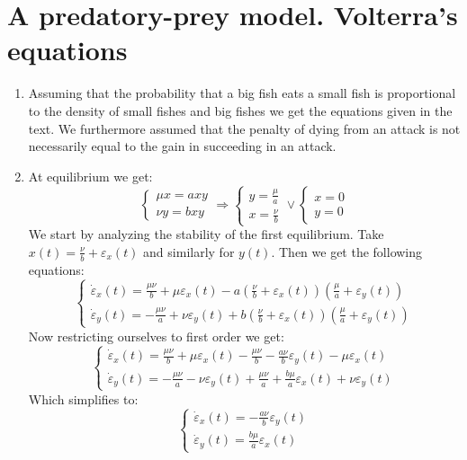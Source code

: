 \documentclass[10pt,a4paper]{book}
\begin{document}
\section{A predatory-prey model. Volterra's equations}

\begin{enumerate}
\item Assuming that the probability that a big fish eats a small fish is proportional to the density of small fishes and big fishes we get the equations given in the text. We furthermore assumed that the penalty of dying from an attack is not necessarily equal to the gain in succeeding in an attack. 

\item At equilibrium we get:
\[
\begin{cases}
\mu x = a xy\\
\nu y = b xy
\end{cases} \Rightarrow \begin{cases}
y = \frac{\mu}{a}\\
x = \frac{\nu}{b}
\end{cases} \lor \begin{cases}
x = 0\\
y = 0
\end{cases}
\]
We start by analyzing the stability of the first equilibrium. Take $x(t) = \frac{\nu}{b} + \varepsilon_x(t)$ and similarly for $y(t)$. Then we get the following equations:
\[
\begin{cases}
\dot{\varepsilon}_x(t) = \frac{\mu \nu}{b} + \mu \varepsilon_x(t) - a\left( \frac{\nu}{b} + \varepsilon_x(t) \right)\left( \frac{\mu}{a} + \varepsilon_y(t) \right)\\
\dot{\varepsilon}_y(t) = -\frac{\mu \nu}{a} + \nu \varepsilon_y(t) + b\left( \frac{\nu}{b} + \varepsilon_x(t) \right)\left( \frac{\mu}{a} + \varepsilon_y(t) \right)
\end{cases}
\]
Now restricting ourselves to first order we get:
\[
\begin{cases}
\dot{\varepsilon}_x(t) = \frac{\mu \nu}{b} + \mu \varepsilon_x(t) - \frac{\mu \nu}{b} - \frac{a \nu}{b} \varepsilon_y(t) - \mu \varepsilon_x(t)\\
\dot{\varepsilon}_y(t) = -\frac{\mu \nu}{a} - \nu \varepsilon_y(t) + \frac{\mu \nu}{a} + \frac{b \mu}{a} \varepsilon_x(t) + \nu \varepsilon_y(t)
\end{cases}
\]
Which simplifies to:
\[
\begin{cases}

\dot{\varepsilon}_x(t) = - \frac{a \nu }{b} \varepsilon_y(t)\\
\dot{\varepsilon}_y(t) = \frac{b \mu}{a} \varepsilon_x(t)


\end{cases}\]
\end{enumerate}
\end{document}
